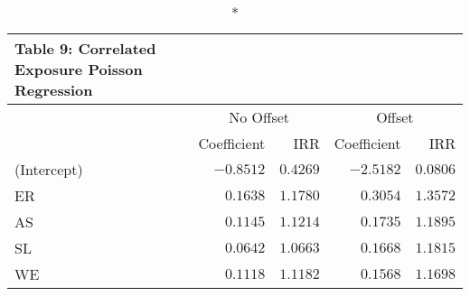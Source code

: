 \begin{longtable}{l|rrrr}
\caption*{
{\large Table 9: Correlated Exposure Poisson Regression}
} \\ 
\toprule
\multicolumn{1}{l}{} & \multicolumn{2}{c}{No Offset} & \multicolumn{2}{c}{Offset} \\ 
\cmidrule(lr){2-3} \cmidrule(lr){4-5}
\multicolumn{1}{l}{} & Coefficient & IRR & Coefficient & IRR \\ 
\midrule
(Intercept) & $-0.8512$ & $0.4269$ & $-2.5182$ & $0.0806$ \\ 
ER & $0.1638$ & $1.1780$ & $0.3054$ & $1.3572$ \\ 
AS & $0.1145$ & $1.1214$ & $0.1735$ & $1.1895$ \\ 
SL & $0.0642$ & $1.0663$ & $0.1668$ & $1.1815$ \\ 
WE & $0.1118$ & $1.1182$ & $0.1568$ & $1.1698$ \\ 
\bottomrule
\end{longtable}

